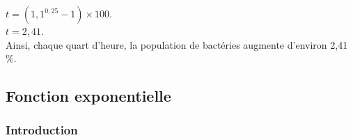 $t = \left(1,1^{0,25} - 1\right) \times 100$. \vspace*{.3cm} \\

$t = 2,41$. \\

Ainsi, chaque quart d'heure, la population de bactéries augmente d'environ 2,41 \%.


\newpage

\vspace*{-2cm}

\subsection{Fonction exponentielle}

\vspace*{-.1cm}

\subsubsection{Introduction}

